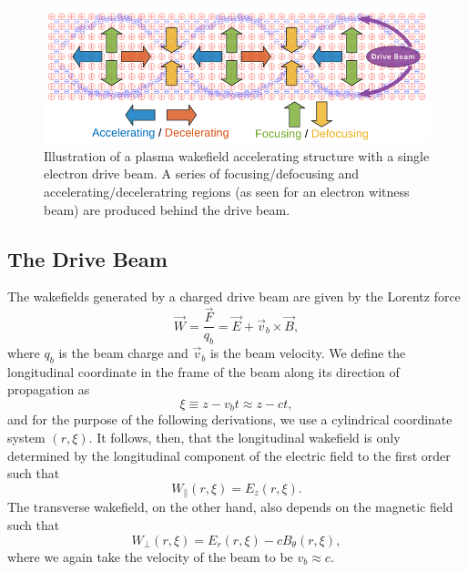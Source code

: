 \begin{figure}[hbt]
    \centering
    \includegraphics[width=0.85\linewidth,trim={0mm 0mm 0mm 0mm},clip]{figures/PlasmaWakefield}
    \caption{\label{Fig:PWFA:Illust} Illustration of a plasma wakefield accelerating structure with a single electron drive beam. A series of focusing/defocusing and accelerating/deceleratring regions (as seen for an electron witness beam) are produced behind the drive beam.}
\end{figure}

\subsection{The Drive Beam}
\label{Int:BPI:Drive}

The wakefields generated by a charged drive beam are given by the Lorentz force
\begin{equation}
    \vec{W} = \frac{\vec{F}}{q_{b}} = \vec{E} + \vec{v}_{b} \times \vec{B}, \label{EQ:Lorentz}
\end{equation}
where $q_{b}$ is the beam charge and $\vec{v}_{b}$ is the beam velocity. We define the longitudinal coordinate in the frame of the beam along its direction of propagation as
\begin{equation}
    \xi \equiv z - v_{b}t \approx z - ct, \label{EQ:Xi}
\end{equation}
and for the purpose of the following derivations, we use a cylindrical coordinate system $(r, \xi)$. It follows, then, that the longitudinal wakefield is only determined by the longitudinal component of the electric field \dash to the first order \dash such that
\begin{equation}
    W_{\parallel}(r,\xi) = E_{z}(r,\xi). \label{EQ:Wz}
\end{equation}
The transverse wakefield, on the other hand, also depends on the magnetic field such that
\begin{equation}
    W_{\perp}(r,\xi) = E_{r}(r,\xi) - cB_{\theta}(r,\xi), \label{EQ:Wr}
\end{equation}
where we again take the velocity of the beam to be $v_{b} \approx c$.

